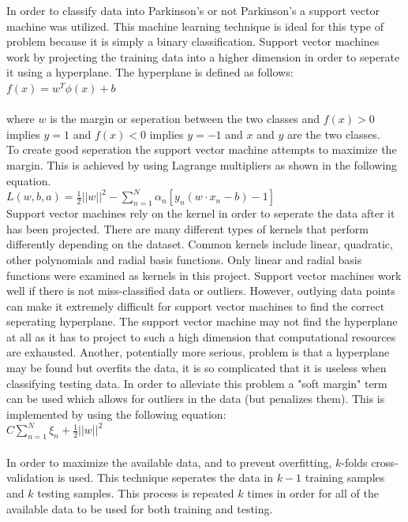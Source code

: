 \documentclass[twoside]{article}
\begin{document}
\begin{multicols}{2}
In order to classify data into Parkinson's or not Parkinson's a support vector machine was utilized.
This machine learning technique is ideal for this type of problem because it is simply a binary 
classification. Support vector machines work by projecting the training data into a higher dimension in 
order to seperate it using a hyperplane. The hyperplane is defined as follows:\\ 
$f(x) = w^T \phi (x) + b$\\ \\
where $w$ is the margin or seperation between the two classes and $f(x)>0$ implies $y = 1$
and $f(x) <0$ implies $y = -1$ and $x$ and $y$ are the two classes.\\ 
To create good seperation the support vector machine attempts to maximize
the margin. This is achieved by using Lagrange multipliers as shown in the following equation.\\ 
$L(w,b,a) = \frac{1}{2} || w||^2 - \sum \limits_{n=1} ^{N} \alpha_n [ y_n (w \cdot x_n -b) -1 ] $\\
Support vector machines rely on the kernel in order to seperate the data after it has been projected. There are many
different types of kernels that perform differently depending on the dataset. Common kernels include linear, quadratic,
other polynomials and radial basis functions. Only linear and radial basis functions were examined as kernels in
this project.
Support vector machines work well if there is not miss-classified data or
outliers. However, outlying data points can make it extremely difficult for support vector machines to find
the correct seperating hyperplane. The support vector machine may not find the hyperplane at all as it has to project
to such a high dimension that computational resources are exhausted. Another, potentially more serious, problem
is that a hyperplane may be found but overfits the data, it is so complicated that it is useless when classifying testing data.
In order to alleviate this problem a "soft margin" term can be used which allows for outliers in the
data (but penalizes them). This is implemented by using the following equation:\\ 
$C \sum \limits_{n=1} ^{N} \xi _n + \frac{1}{2} || w ||^2$\\ \\
In order to maximize the available data, and to prevent overfitting, $k$-folds cross-validation is used.
This technique seperates the data in $k-1$ training samples and $k$ testing samples. This process is
repeated $k$ times in order for all of the available data to be used for both training and testing.\\

\end{multicols}
\end{document}
